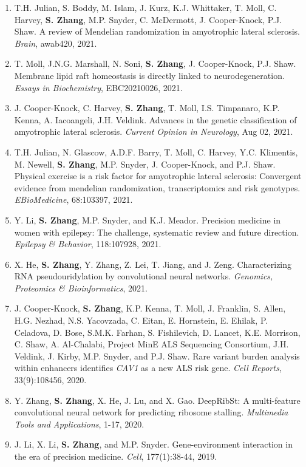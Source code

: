 \documentclass[10pt]{article}
\makeatletter
\newlength{\bibhang}
\newlength{\bibsep}
 {\@listi \global\bibsep\itemsep \global\advance\bibsep by\parsep}
\newenvironment{bibsection}%
        {\begin{enumerate}{}{%
       \setlength{\leftmargin}{\bibhang}%
       \setlength{\itemindent}{-\leftmargin}%
       \setlength{\itemsep}{\bibsep}%
       \setlength{\parsep}{\z@}%
        \setlength{\partopsep}{0pt}%
        \setlength{\topsep}{0pt}}}
        {\end{enumerate}\vspace{-.6\baselineskip}}
\makeatother
\begin{document}
\begin{bibsection}
     \item T.H. Julian, S. Boddy, M. Islam, J. Kurz, K.J. Whittaker, T. Moll, C. Harvey, {\bf S. Zhang}, M.P. Snyder, C. McDermott, J. Cooper-Knock, P.J. Shaw. A review of Mendelian randomization in amyotrophic lateral sclerosis. \emph{Brain}, awab420, 2021.
     \item T. Moll, J.N.G. Marshall, N. Soni, {\bf S. Zhang}, J. Cooper-Knock, P.J. Shaw. Membrane lipid raft homeostasis is directly linked to neurodegeneration. \emph{Essays in Biochemistry}, EBC20210026, 2021. 
     \item J. Cooper-Knock, C. Harvey, {\bf S. Zhang}, T. Moll, I.S. Timpanaro, K.P. Kenna, A. Iacoangeli, J.H. Veldink. Advances in the genetic classification of amyotrophic lateral sclerosis. \emph{Current Opinion in Neurology}, Aug 02, 2021.
     \item T.H. Julian, N. Glascow, A.D.F. Barry, T. Moll, C. Harvey, Y.C. Klimentis, M. Newell, {\bf S. Zhang}, M.P. Snyder, J. Cooper-Knock, and P.J. Shaw. Physical exercise is a risk factor for amyotrophic lateral sclerosis: Convergent evidence from mendelian randomization, transcriptomics and risk genotypes. \emph{EBioMedicine}, 68:103397, 2021.
     \item Y. Li, {\bf S. Zhang}, M.P. Snyder, and K.J. Meador. Precision medicine in women with epilepsy: The challenge, systematic review and future direction. \emph{Epilepsy \& Behavior}, 118:107928, 2021.
     \item X. He, {\bf S. Zhang}, Y. Zhang, Z. Lei, T. Jiang, and J. Zeng. Characterizing RNA pseudouridylation by convolutional neural networks. \emph{Genomics, Proteomics \& Bioinformatics}, 2021.
     \item J. Cooper-Knock, {\bf S. Zhang}, K.P. Kenna, T. Moll, J. Franklin, S. Allen, H.G. Nezhad, N.S. Yacovzada, C. Eitan, E. Hornstein, E. Ehilak, P. Celadova, D. Bose, S.M.K. Farhan, S. Fishilevich, D. Lancet, K.E. Morrison, C. Shaw, A. Al-Chalabi, Project MinE ALS Sequencing Consortium, J.H. Veldink, J. Kirby, M.P. Snyder, and P.J. Shaw. Rare variant burden analysis within enhancers identifies \emph{CAV1} as a new ALS risk gene. \emph{Cell Reports}, 33(9):108456, 2020.
      \item Y. Zhang, {\bf S. Zhang}, X. He, J. Lu, and X. Gao. DeepRibSt: A multi-feature convolutional neural network for predicting ribosome stalling. \emph{Multimedia Tools and Applications}, 1-17, 2020.
     \item J. Li, X. Li, {\bf S. Zhang}, and M.P. Snyder. Gene-environment interaction in the era of precision medicine. \emph{Cell}, 177(1):38-44, 2019.

\end{bibsection}
\end{document}
